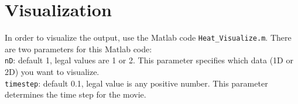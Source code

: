 \documentclass[letterpaper,12pt,fleqn]{article}
\newcommand{\code}[1]{\colorbox{shadecolor}{\tt #1}}
\begin{document}
\section*{Visualization}
In order to visualize the output, use the Matlab code \verb|Heat_Visualize.m|.
There are two parameters for this Matlab code:\\
\indent\code{nD}: default 1, legal values are 1 or 2.
This parameter specifies which data (1D or 2D) you want to visualize.\\
\indent\code{timestep}: default 0.1, legal value is any positive number.
This parameter determines the time step for the movie.
\end{document}
